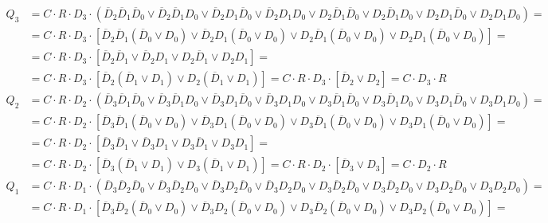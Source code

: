 \documentclass[oneside,a4paper,14pt]{extarticle}
\begin{document}
\begin{align*}
  Q_3 &= C \cdot R \cdot D_3 \cdot (\overline{D}_2\overline{D}_1\overline{D}_0 \vee \overline{D}_2\overline{D}_1D_0 \vee \overline{D}_2D_1\overline{D}_0 \vee \overline{D}_2D_1D_0 \vee D_2\overline{D}_1\overline{D}_0 \vee D_2\overline{D}_1D_0 \vee D_2D_1\overline{D}_0 \vee D_2D_1D_0) = \\
      &= C \cdot R \cdot D_3 \cdot [\overline{D}_2\overline{D}_1(\overline{D}_0 \vee D_0) \vee \overline{D}_2D_1(\overline{D}_0 \vee D_0) \vee D_2\overline{D}_1(\overline{D}_0 \vee D_0) \vee D_2D_1(\overline{D}_0 \vee D_0)] = \\
      &= C \cdot R \cdot D_3 \cdot [\overline{D}_2\overline{D}_1 \vee \overline{D}_2D_1 \vee D_2\overline{D}_1 \vee D_2D_1] = \\
      &= C \cdot R \cdot D_3 \cdot [\overline{D}_2(\overline{D}_1 \vee D_1) \vee D_2(\overline{D}_1 \vee D_1)] = C \cdot R \cdot D_3 \cdot [\overline{D}_2 \vee D_2] = C \cdot D_3 \cdot R \\[3mm]
  Q_2 &= C \cdot R \cdot D_2 \cdot (\overline{D}_3\overline{D}_1\overline{D}_0 \vee \overline{D}_3\overline{D}_1D_0 \vee \overline{D}_3D_1\overline{D}_0 \vee \overline{D}_3D_1D_0 \vee D_3\overline{D}_1\overline{D}_0 \vee D_3\overline{D}_1D_0 \vee D_3D_1\overline{D}_0 \vee D_3D_1D_0) = \\
      &= C \cdot R \cdot D_2 \cdot [\overline{D}_3\overline{D}_1(\overline{D}_0 \vee D_0) \vee \overline{D}_3D_1(\overline{D}_0 \vee D_0) \vee D_3\overline{D}_1(\overline{D}_0 \vee D_0) \vee D_3D_1(\overline{D}_0 \vee D_0)] = \\
      &= C \cdot R \cdot D_2 \cdot [\overline{D}_3\overline{D}_1 \vee \overline{D}_3D_1 \vee D_3\overline{D}_1 \vee D_3D_1] = \\
      &= C \cdot R \cdot D_2 \cdot [\overline{D}_3(\overline{D}_1 \vee D_1) \vee D_3(\overline{D}_1 \vee D_1)] = C \cdot R \cdot D_2 \cdot [\overline{D}_3 \vee D_3] = C \cdot D_2 \cdot R \\[3mm]
  Q_1 &= C \cdot R \cdot D_1 \cdot (\overline{D}_3\overline{D}_2\overline{D}_0 \vee \overline{D}_3\overline{D}_2D_0 \vee \overline{D}_3D_2\overline{D}_0 \vee \overline{D}_3D_2D_0 \vee D_3\overline{D}_2\overline{D}_0 \vee D_3\overline{D}_2D_0 \vee D_3D_2\overline{D}_0 \vee D_3D_2D_0) = \\
      &= C \cdot R \cdot D_1 \cdot [\overline{D}_3\overline{D}_2(\overline{D}_0 \vee D_0) \vee \overline{D}_3D_2(\overline{D}_0 \vee D_0) \vee D_3\overline{D}_2(\overline{D}_0 \vee D_0) \vee D_3D_2(\overline{D}_0 \vee D_0)] = \\

\end{align*}
\end{document}
